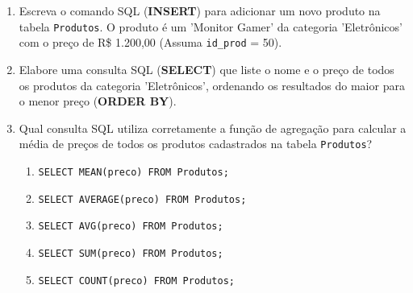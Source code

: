 \documentclass[12pt,a4paper]{article}
\newcommand{\resposta}[1]{
\noindent
\framebox[\textwidth]{
\begin{minipage}{0.98\textwidth}
\vspace{#1}
\end{minipage}
}
}
\begin{document}
\begin{enumerate}
    \newpage

    \textbf{CONTEXTO PARA AS QUESTÕES 6 A 10:} Considere o modelo lógico de um sistema de vendas abaixo:
    \begin{center}
    \end{center}

    \item Escreva o comando SQL (\textbf{INSERT}) para adicionar um novo produto na tabela \texttt{Produtos}. O produto é um 'Monitor Gamer' da categoria 'Eletrônicos' com o preço de R\$ 1.200,00 (Assuma \texttt{id\_prod} = 50).\\
    \resposta{3cm}

    \item Elabore uma consulta SQL (\textbf{SELECT}) que liste o nome e o preço de todos os produtos da categoria 'Eletrônicos', ordenando os resultados do maior para o menor preço (\textbf{ORDER BY}).\\
    \resposta{3cm}

    \item Qual consulta SQL utiliza corretamente a função de agregação para calcular a média de preços de todos os produtos cadastrados na tabela \texttt{Produtos}?
    \begin{enumerate}[label=\Alph*)]
        \item \texttt{SELECT MEAN(preco) FROM Produtos;}
        \item \texttt{SELECT AVERAGE(preco) FROM Produtos;}
        \item \texttt{SELECT AVG(preco) FROM Produtos;}
        \item \texttt{SELECT SUM(preco) FROM Produtos;}
        \item \texttt{SELECT COUNT(preco) FROM Produtos;}
    \end{enumerate}


\end{enumerate}
\end{document}
